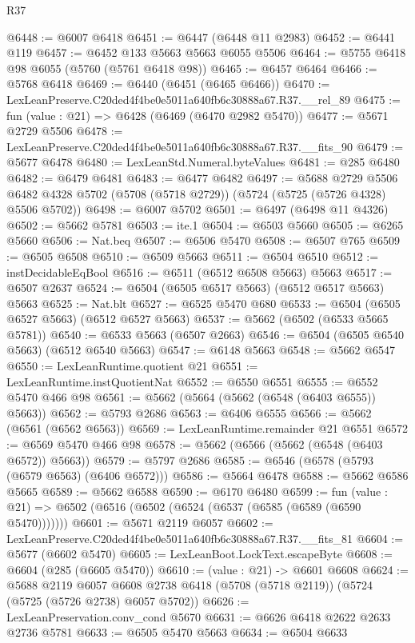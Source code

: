 \begin{lexlean}{R37}
\begin{coremodule}
@6448 := @6007 @6418
@6451 := @6447 (@6448 @11 @2983)
@6452 := @6441 @119
@6457 := @6452 @133 @5663 @5663 @6055 @5506
@6464 := @5755 @6418 @98 @6055 (@5760 (@5761 @6418 @98))
@6465 := @6457 @6464
@6466 := @5768 @6418
@6469 := @6440 (@6451 (@6465 @6466))
@6470 := LexLeanPreserve.C20ded4f4be0e5011a640fb6c30888a67.R37.__rel_89
@6475 := fun (value : @21) => @6428 (@6469 (@6470 @2982 @5470))
@6477 := @5671 @2729 @5506
@6478 := LexLeanPreserve.C20ded4f4be0e5011a640fb6c30888a67.R37.__fits_90
@6479 := @5677 @6478
@6480 := LexLeanStd.Numeral.byteValues
@6481 := @285 @6480
@6482 := @6479 @6481
@6483 := @6477 @6482
@6497 := @5688
    @2729
    @5506
    @6482
    @4328
    @5702
    (@5708 (@5718 @2729))
    (@5724 (@5725 (@5726 @4328) @5506 @5702))
@6498 := @6007 @5702
@6501 := @6497 (@6498 @11 @4326)
@6502 := @5662 @5781
@6503 := ite.{1}
@6504 := @6503 @5660
@6505 := @6265 @5660
@6506 := Nat.beq
@6507 := @6506 @5470
@6508 := @6507 @765
@6509 := @6505 @6508
@6510 := @6509 @5663
@6511 := @6504 @6510
@6512 := instDecidableEqBool
@6516 := @6511 (@6512 @6508 @5663) @5663
@6517 := @6507 @2637
@6524 := @6504 (@6505 @6517 @5663) (@6512 @6517 @5663) @5663
@6525 := Nat.blt
@6527 := @6525 @5470 @680
@6533 := @6504 (@6505 @6527 @5663) (@6512 @6527 @5663)
@6537 := @5662 (@6502 (@6533 @5665 @5781))
@6540 := @6533 @5663 (@6507 @2663)
@6546 := @6504 (@6505 @6540 @5663) (@6512 @6540 @5663)
@6547 := @6148 @5663
@6548 := @5662 @6547
@6550 := LexLeanRuntime.quotient @21
@6551 := LexLeanRuntime.instQuotientNat
@6552 := @6550 @6551
@6555 := @6552 @5470 @466 @98
@6561 := @5662 (@5664 (@5662 (@6548 (@6403 @6555)) @5663))
@6562 := @5793 @2686
@6563 := @6406 @6555
@6566 := @5662 (@6561 (@6562 @6563))
@6569 := LexLeanRuntime.remainder @21 @6551
@6572 := @6569 @5470 @466 @98
@6578 := @5662 (@6566 (@5662 (@6548 (@6403 @6572)) @5663))
@6579 := @5797 @2686
@6585 := @6546 (@6578 (@5793 (@6579 @6563) (@6406 @6572)))
@6586 := @5664 @6478
@6588 := @5662 @6586 @5665
@6589 := @5662 @6588
@6590 := @6170 @6480
@6599 := fun (value : @21) => @6502 (@6516 (@6502 (@6524 (@6537 (@6585 (@6589 (@6590 @5470)))))))
@6601 := @5671 @2119 @6057
@6602 := LexLeanPreserve.C20ded4f4be0e5011a640fb6c30888a67.R37.__fits_81
@6604 := @5677 (@6602 @5470)
@6605 := LexLeanBoot.LockText.escapeByte
@6608 := @6604 (@285 (@6605 @5470))
@6610 := (value : @21) -> @6601 @6608
@6624 := @5688
    @2119
    @6057
    @6608
    @2738
    @6418
    (@5708 (@5718 @2119))
    (@5724 (@5725 (@5726 @2738) @6057 @5702))
@6626 := LexLeanPreservation.conv_cond @5670
@6631 := @6626 @6418 @2622 @2633 @2736 @5781
@6633 := @6505 @5470 @5663
@6634 := @6504 @6633

\end{coremodule}
\end{lexlean}
